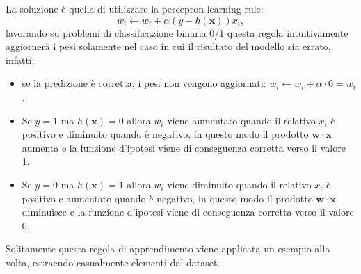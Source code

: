 \documentclass[../../main.tex]{subfiles}
\begin{document}
    La soluzione è quella di utilizzare la percepron learning rule:
    \[w_i \leftarrow w_i + \alpha (y - h(\boldsymbol{x})) x_i, \]
    lavorando su problemi di classificazione binaria 0/1 questa regola intuitivamente aggiornerà i pesi solamente nel caso in cui il risultato del modello sia errato, infatti:
    \begin{itemize}
        \item se la predizione è corretta, i pesi non vengono aggiornati: $w_i \leftarrow w_i + \alpha \cdot 0 = w_i$.
        \item Se $y = 1$ ma $h(\boldsymbol{x}) = 0$ allora $w_i$ viene aumentato quando il relativo $x_i$ è positivo e diminuito quando è negativo, in questo modo il prodotto $\boldsymbol{w} \cdot \boldsymbol{x}$ aumenta e la funzione d'ipotesi viene di conseguenza corretta  verso il valore 1.
        \item Se $y = 0$ ma $h(\boldsymbol{x}) = 1$ allora $w_i$ viene diminuito quando il relativo $x_i$ è positivo e aumentato quando è negativo, in questo modo il prodotto $\boldsymbol{w} \cdot \boldsymbol{x}$ diminuisce e la funzione d'ipotesi viene di conseguenza corretta verso il valore 0.
    \end{itemize}
    Solitamente questa regola di apprendimento viene applicata un esempio alla volta, estraendo casualmente elementi dal dataset.
\end{document}
